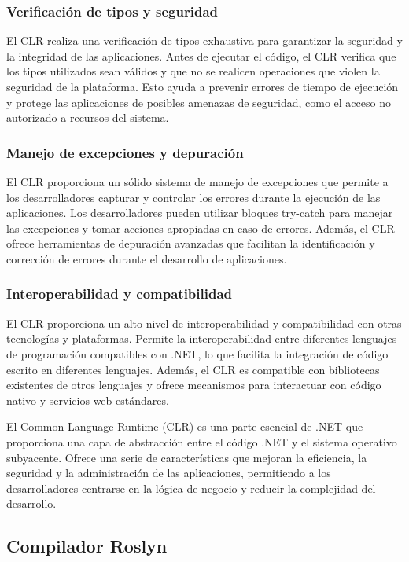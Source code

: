 \documentclass[executivepaper]{article}
\begin{document}
\subsubsection*{Verificación de tipos y seguridad}
El CLR realiza una verificación de tipos exhaustiva para garantizar la seguridad y la integridad de las aplicaciones. Antes de ejecutar el código, el CLR verifica que los tipos utilizados sean válidos y que no se realicen operaciones que violen la seguridad de la plataforma. Esto ayuda a prevenir errores de tiempo de ejecución y protege las aplicaciones de posibles amenazas de seguridad, como el acceso no autorizado a recursos del sistema.

\subsubsection*{Manejo de excepciones y depuración}
El CLR proporciona un sólido sistema de manejo de excepciones que permite a los desarrolladores capturar y controlar los errores durante la ejecución de las aplicaciones. Los desarrolladores pueden utilizar bloques try-catch para manejar las excepciones y tomar acciones apropiadas en caso de errores. Además, el CLR ofrece herramientas de depuración avanzadas que facilitan la identificación y corrección de errores durante el desarrollo de aplicaciones.

\subsubsection*{Interoperabilidad y compatibilidad}
El CLR proporciona un alto nivel de interoperabilidad y compatibilidad con otras tecnologías y plataformas. Permite la interoperabilidad entre diferentes lenguajes de programación compatibles con .NET, lo que facilita la integración de código escrito en diferentes lenguajes. Además, el CLR es compatible con bibliotecas existentes de otros lenguajes y ofrece mecanismos para interactuar con código nativo y servicios web estándares.

El Common Language Runtime (CLR) es una parte esencial de .NET que proporciona una capa de abstracción entre el código .NET y el sistema operativo subyacente. Ofrece una serie de características que mejoran la eficiencia, la seguridad y la administración de las aplicaciones, permitiendo a los desarrolladores centrarse en la lógica de negocio y reducir la complejidad del desarrollo.

\subsection{Compilador Roslyn}
\end{document}
